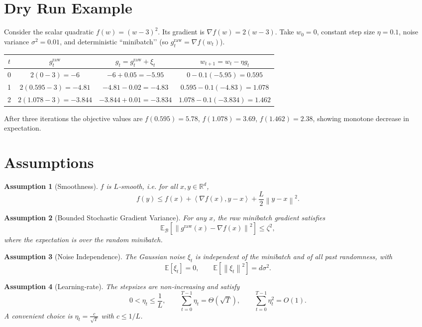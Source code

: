 \documentclass{article}
\newtheorem{assumption}{Assumption}
\newcommand{\E}{\mathbb{E}}
\newcommand{\R}{\mathbb{R}}
\newcommand{\norm}[1]{\left\|#1\right\|}
\newcommand{\inner}[2]{\left\langle #1,#2\right\rangle}
\begin{document}
\section*{Dry Run Example}
Consider the scalar quadratic $f(w)=(w-3)^{2}$.  
Its gradient is $\nabla f(w)=2(w-3)$.  
Take $w_{0}=0$, constant step size $\eta=0.1$, noise variance $\sigma^{2}=0.01$, and deterministic ``minibatch’’ (so $g^{\text{raw}}_{t}=\nabla f(w_{t})$).

\begin{center}
\begin{tabular}{c|c|c|c}
$t$ & $g^{\text{raw}}_{t}$ & $g_{t}=g^{\text{raw}}_{t}+\xi_{t}$ & $w_{t+1}=w_{t}-\eta g_{t}$\\ \hline
0 & $2(0-3)=-6$ & $-6+0.05=-5.95$ & $0-0.1(-5.95)=0.595$\\
1 & $2(0.595-3)=-4.81$ & $-4.81-0.02=-4.83$ & $0.595-0.1(-4.83)=1.078$\\
2 & $2(1.078-3)=-3.844$ & $-3.844+0.01=-3.834$ & $1.078-0.1(-3.834)=1.462$\\
\end{tabular}
\end{center}
After three iterations the objective values are
$f(0.595)=5.78$, $f(1.078)=3.69$, $f(1.462)=2.38$, showing monotone decrease in expectation.

\newpage
\section*{Assumptions}
\begin{assumption}[Smoothness]\label{ass:smooth}
$f$ is $L$‑smooth, i.e. for all $x,y\in\R^{d}$,
\[
f(y)\le f(x)+\inner{\nabla f(x)}{y-x}+\frac{L}{2}\norm{y-x}^{2}.
\]
\end{assumption}
\begin{assumption}[Bounded Stochastic Gradient Variance]\label{ass:var}
For any $x$, the raw minibatch gradient satisfies
\[
\E_{\mathcal{B}}\!\left[\norm{g^{\text{raw}}(x)-\nabla f(x)}^{2}\right]\le \zeta^{2},
\]
where the expectation is over the random minibatch.
\end{assumption}
\begin{assumption}[Noise Independence]\label{ass:noise}
The Gaussian noise $\xi_{t}$ is independent of the minibatch and of all past randomness, with
\[
\E[\xi_{t}]=0,\qquad \E[\norm{\xi_{t}}^{2}]=d\sigma^{2}.
\]
\end{assumption}
\begin{assumption}[Learning‑rate]\label{ass:lr}
The stepsizes are non‑increasing and satisfy
\[
0<\eta_{t}\le \frac{1}{L},\qquad \sum_{t=0}^{T-1}\eta_{t}= \Theta(\sqrt{T}),\qquad 
\sum_{t=0}^{T-1}\eta_{t}^{2}=O(1).
\]
A convenient choice is $\eta_{t}=\frac{c}{\sqrt{T}}$ with $c\le 1/L$.
\end{assumption}
\end{document}
